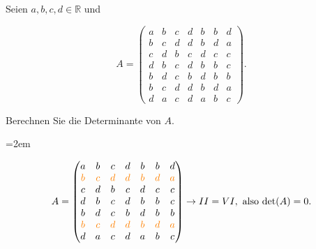 \newpage

\subsubsection{}

Seien \( a, b, c, d \in \mathbb{R} \) und

\begin{equation*}
    A = \begin{pmatrix}
    a & b & c & d & b & b & d \\
    b & c & d & d & b & d & a \\
    c & d & b & c & d & c & c \\
    d & b & c & d & b & b & c \\
    b & d & c & b & d & b & b \\
    b & c & d & d & b & d & a \\
    d & a & c & d & a & b & c 
    \end{pmatrix}.
\end{equation*}

Berechnen Sie die Determinante von \( A \).

\vspace{1\baselineskip}

\begin{solution}    

    \vspace{1\baselineskip}

    \leftskip=2em

    \begin{equation*}
    A = \begin{pmatrix}
    a & b & c & d & b & b & d \\
    \textcolor{orange}{b} & \textcolor{orange}{c} & \textcolor{orange}{d} & \textcolor{orange}{d} & \textcolor{orange}{b} & \textcolor{orange}{d} & \textcolor{orange}{a} \\
    c & d & b & c & d & c & c \\
    d & b & c & d & b & b & c \\
    b & d & c & b & d & b & b \\
    \textcolor{orange}{b} & \textcolor{orange}{c} & \textcolor{orange}{d} & \textcolor{orange}{d} & \textcolor{orange}{b} & \textcolor{orange}{d} & \textcolor{orange}{a} \\
    d & a & c & d & a & b & c 
    \end{pmatrix} \rightarrow II = VI, \ \text{also det}(A) = 0.
\end{equation*}    

\end{solution}
